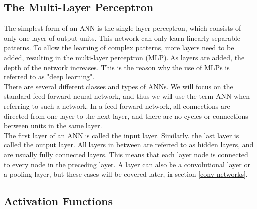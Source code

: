 \subsection{The Multi-Layer Perceptron}

\noindent The simplest form of an ANN is the single layer perceptron, which consists of only one layer of output units. This network can only learn linearly separable patterns. To allow the learning of complex patterns, more layers need to be added, resulting in the multi-layer perceptron (MLP). As layers are added, the depth of the network increases. This is the reason why the use of MLPs is referred to as "deep learning".\\

\noindent There are several different classes and types of ANNs. We will focus on the standard feed-forward neural network, and thus we will use the term ANN when referring to such a network. In a feed-forward network, all connections are directed from one layer to the next layer, and there are no cycles or connections between units in the same layer. \\

\noindent The first layer of an ANN is called the input layer. Similarly, the last layer is called the output layer. All layers in between are referred to as hidden layers, and are usually fully connected layers. This means that each layer node is connected to every node in the preceding layer. A layer can also be a convolutional layer or a pooling layer, but these cases will be covered later, in section \ref{conv-networks}.

\subsection{Activation Functions}

